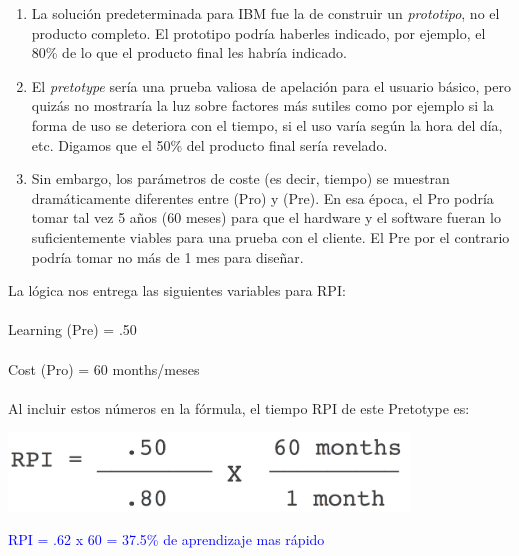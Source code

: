 \documentclass{article}
\newcommand{\tab}{\hspace*{2em}}
\begin{document}
\begin{enumerate}

\item La soluci\'on predeterminada para IBM fue la de construir un \textit{prototipo}, no el producto completo. El prototipo podr\'ia haberles indicado, por ejemplo, el 80\% de lo que el producto final les habr\'ia indicado.

\item El \textit{pretotype} ser\'ia una prueba valiosa de apelaci\'on para el usuario b\'asico, pero quiz\'as no mostrar\'ia la luz sobre factores m\'as sutiles como por ejemplo si la forma de uso se  deteriora con el tiempo, si el uso var\'ia seg\'un la hora del d\'ia, etc. Digamos que el 50\% del producto final ser\'ia revelado.

\item Sin embargo, los par\'ametros de coste (es decir, tiempo) se muestran dram\'aticamente diferentes entre (Pro) y (Pre). En esa \'epoca, el Pro podr\'ia tomar tal vez 5 a\~nos (60 meses) para que el hardware y el software fueran lo suficientemente viables para una prueba con el cliente. El Pre por el contrario podr\'ia tomar no m\'as de 1 mes para dise\~nar.

\end{enumerate}

La l\'ogica nos entrega las siguientes variables para RPI:
\\ \\
Learning (Pre) = .50 \tab \tab \tab \tab{Learning (Pro) = .80}
\\ \\
Cost (Pro) = 60 months/meses \tab \tab {Cost (Pre) = 1 month/mes}
\\ \\
Al incluir estos n\'umeros en la f\'ormula, el tiempo RPI de este Pretotype es:

\begin{center}
    \includegraphics[width=0.8\textwidth]{tiempo_RPI}
\end{center}

\begin{center}
\textcolor{blue}{\large RPI = .62 x 60 = 37.5\% de aprendizaje mas r\'apido}
\end{center}
\end{document}
